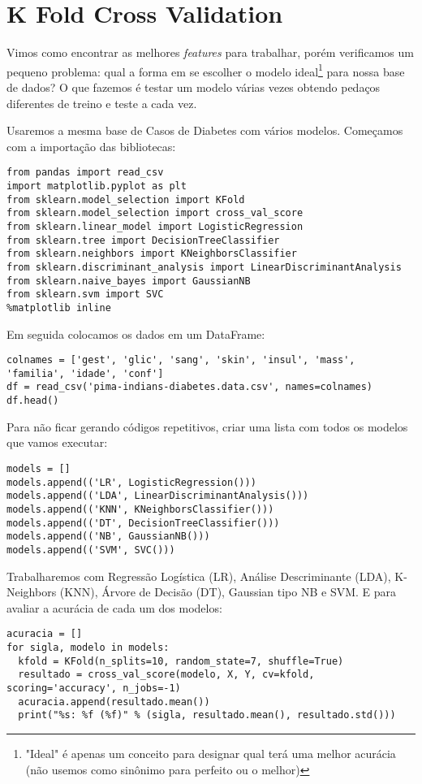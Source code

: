 \section{K Fold Cross Validation}
Vimos como encontrar as melhores \textit{features} para trabalhar, porém verificamos um pequeno problema: qual a forma em se escolher o modelo ideal\footnote{"Ideal" é apenas um conceito para designar qual terá uma melhor acurácia (não usemos como sinônimo para perfeito ou o melhor)} para nossa base de dados? O que fazemos é testar um modelo várias vezes obtendo pedaços diferentes de treino e teste a cada vez.

Usaremos a mesma base de Casos de Diabetes com vários modelos. Começamos com a importação das bibliotecas:
\begin{lstlisting}
from pandas import read_csv
import matplotlib.pyplot as plt
from sklearn.model_selection import KFold
from sklearn.model_selection import cross_val_score
from sklearn.linear_model import LogisticRegression
from sklearn.tree import DecisionTreeClassifier
from sklearn.neighbors import KNeighborsClassifier
from sklearn.discriminant_analysis import LinearDiscriminantAnalysis
from sklearn.naive_bayes import GaussianNB
from sklearn.svm import SVC
%matplotlib inline
\end{lstlisting}

Em seguida colocamos os dados em um DataFrame:
\begin{lstlisting}
colnames = ['gest', 'glic', 'sang', 'skin', 'insul', 'mass', 'familia', 'idade', 'conf']
df = read_csv('pima-indians-diabetes.data.csv', names=colnames)
df.head()
\end{lstlisting}

Para não ficar gerando códigos repetitivos, criar uma lista com todos os modelos que vamos executar:
\begin{lstlisting}
models = []
models.append(('LR', LogisticRegression()))
models.append(('LDA', LinearDiscriminantAnalysis()))
models.append(('KNN', KNeighborsClassifier()))
models.append(('DT', DecisionTreeClassifier()))
models.append(('NB', GaussianNB()))
models.append(('SVM', SVC()))
\end{lstlisting}

Trabalharemos com Regressão Logística (LR), Análise Descriminante (LDA), K-Neighbors (KNN), Árvore de Decisão (DT), Gaussian tipo NB e SVM. E para avaliar a acurácia de cada um dos modelos:
\begin{lstlisting}
acuracia = []
for sigla, modelo in models:
  kfold = KFold(n_splits=10, random_state=7, shuffle=True)
  resultado = cross_val_score(modelo, X, Y, cv=kfold, scoring='accuracy', n_jobs=-1)
  acuracia.append(resultado.mean())
  print("%s: %f (%f)" % (sigla, resultado.mean(), resultado.std())) 
\end{lstlisting}


